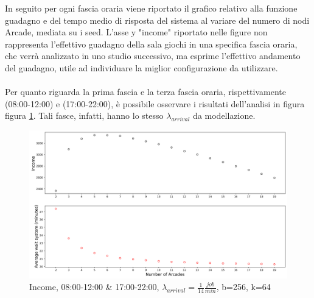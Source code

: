 \documentclass{article}
\begin{document}
In seguito per ogni fascia oraria viene riportato il grafico relativo alla funzione guadagno e del tempo medio di risposta del sistema al variare del numero di nodi Arcade, mediata su i seed. L'asse y "income" riportato nelle figure non rappresenta l'effettivo guadagno della sala giochi in una specifica fascia oraria, che verrà analizzato in uno studio successivo, ma esprime l'effettivo andamento del guadagno, utile ad individuare la miglior configurazione da utilizzare.
\\ \\
Per quanto riguarda la prima fascia e la terza fascia oraria, rispettivamente (08:00-12:00) e (17:00-22:00), è possibile osservare i risultati dell'analisi in figura  figura \ref{figura:avg_wait_sys_mor}. Tali fasce, infatti, hanno lo stesso $\lambda_{arrival}$ da modellazione.
\begin{figure}[H]
	\centering
	\captionsetup{justification=centering,margin=2cm}
	\includegraphics[scale=0.48]{images/avg_wait_sys_mor.png}
	\caption{Income, 08:00-12:00 \& 17:00-22:00, $\lambda_{arrival}=\frac{1}{14} \frac{job}{min}$, b=256, k=64}\label{figura:avg_wait_sys_mor}
\end{figure}
\end{document}
